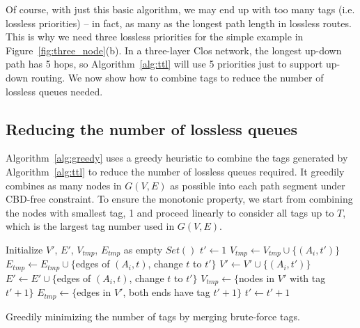 Of course, with just this basic algorithm, we may end up with too many tags
(i.e. lossless priorities) -- in fact, as many as the longest path length in
lossless routes. This is why we need three lossless priorities for
the simple example in Figure~\ref{fig:three_node}(b). In a three-layer Clos
network, the longest up-down path has 5 hops, so Algorithm~\ref{alg:ttl} will use 5
priorities just to support up-down routing. We now show how to combine tags to
reduce the number of lossless queues needed.

\subsection{Reducing the number of lossless queues}




Algorithm~\ref{alg:greedy} uses a greedy heuristic to combine the tags generated
by Algorithm~\ref{alg:ttl} to reduce the number of lossless queues required.  It
greedily combines as many nodes in $G(V,E)$ as possible into each path segment
under CBD-free constraint. To ensure the monotonic property, we start
from combining the nodes with smallest tag, 1 and proceed linearly to consider
all tags up to $T$, which is the largest tag number used in $G(V,E)$.

\begin{algorithm}[t]
	\small
	Initialize $V'$, $E'$, $V_{tmp}$, $E_{tmp}$ as empty $Set()$\;
	$t' \gets 1$\;
	 {
		 {
			$V_{tmp} \gets V_{tmp} \cup \{(A_i, t')\}$\;
			$E_{tmp} \gets E_{tmp} \cup \{$edges of $(A_i, t)$, change $t$ to $t'\}$\;
			 {
				$V' \gets V' \cup \{(A_i, t')\}$\;
				$E' \gets E' \cup \{$edges of $(A_i, t)$, change $t$ to $t'\}$\;
			}
		}
		 {
			$V_{tmp} \gets \{$nodes in $V'$ with tag $t'+1\}$\;
			$E_{tmp} \gets \{$edges in $V'$, both ends have tag $t'+1\}$\;
			$t' \gets t'+1$\;
		}
	}
	\;
    \caption{Greedily minimizing the number of tags by merging brute-force tags.}
	\label{alg:greedy}
\end{algorithm}

